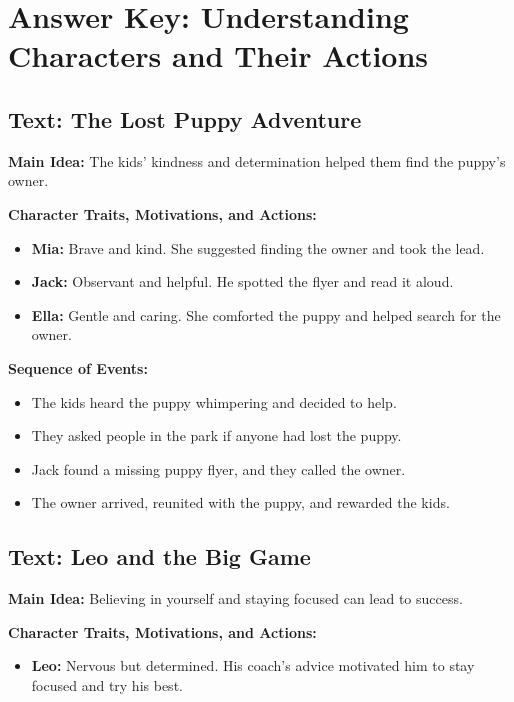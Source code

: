 \documentclass[12pt]{article}
\begin{document}
\section*{Answer Key: Understanding Characters and Their Actions}

\subsection*{Text: The Lost Puppy Adventure}

\textbf{Main Idea:} The kids' kindness and determination helped them find the puppy's owner.

\textbf{Character Traits, Motivations, and Actions:}
\begin{itemize}
    \item \textbf{Mia:} Brave and kind. She suggested finding the owner and took the lead.
    \item \textbf{Jack:} Observant and helpful. He spotted the flyer and read it aloud.
    \item \textbf{Ella:} Gentle and caring. She comforted the puppy and helped search for the owner.
\end{itemize}

\textbf{Sequence of Events:}
\begin{itemize}
    \item The kids heard the puppy whimpering and decided to help.
    \item They asked people in the park if anyone had lost the puppy.
    \item Jack found a missing puppy flyer, and they called the owner.
    \item The owner arrived, reunited with the puppy, and rewarded the kids.
\end{itemize}

\vspace{1em}

\subsection*{Text: Leo and the Big Game}

\textbf{Main Idea:} Believing in yourself and staying focused can lead to success.

\textbf{Character Traits, Motivations, and Actions:}
\begin{itemize}
    \item \textbf{Leo:} Nervous but determined. His coach’s advice motivated him to stay focused and try his best.
\end{itemize}
\end{document}
